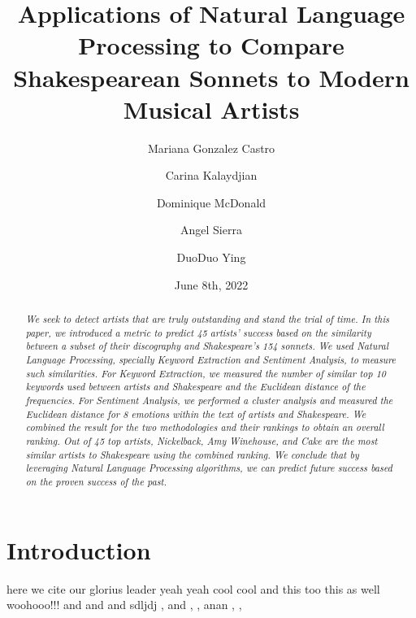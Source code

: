 \documentclass[10pt,a4paper]{article}
\title{Applications of Natural Language Processing to Compare Shakespearean Sonnets to Modern Musical Artists}
\author[*]{Mariana Gonzalez Castro}
\author[*]{Carina Kalaydjian}
\author[*]{Dominique McDonald}
\author[*]{Angel Sierra}
\author[*]{DuoDuo Ying}
\affil[*]{Department of Statistics, UCLA}
\date{June 8th, 2022}
\newcommand{\abstractinenglishname}{Abstract}
\newenvironment{abstractinenglish}{
        \def\abstractname{\abstractinenglishname}
	\begin{abstract}
}{
        \end{abstract}
}
\begin{document}
\maketitle
\vspace{6pt}

\begin{abstractinenglish}
\emph{We seek to detect artists that are truly outstanding and stand the trial of time. In this paper, we introduced a metric to predict 45 artists’ success based on the similarity between a subset of their discography and Shakespeare’s 154 sonnets. We used Natural Language Processing, specially Keyword Extraction and Sentiment Analysis, to measure such similarities. For Keyword Extraction, we measured the number of similar top 10 keywords used between artists and Shakespeare and the Euclidean distance of the frequencies. For Sentiment Analysis, we performed a cluster analysis and measured the Euclidean distance for 8 emotions within the text of artists and Shakespeare. We combined the result for the two methodologies and their rankings to obtain an overall ranking. Out of 45 top artists, Nickelback, Amy Winehouse, and Cake are the most similar artists to Shakespeare using the combined ranking. We conclude that by leveraging Natural Language Processing algorithms, we can predict future success based on the proven success of the past. }
\end{abstractinenglish}

\section{Introduction}
%


here we cite \cite{web1} our glorius leader \cite{web2} yeah yeah cool cool \cite{briney2015data} and this too \cite{monkey} this as well \cite{sonnetsData} woohooo!!! \cite{musicData} and \cite{syuzhet} and \cite{tm} and \cite{shakeFacts} sdljdj \cite{k-means} , \cite{NLP-for-music} and  \cite{NLP-for-lyrics}, \cite{knowledge-graphs}, \cite{nrc-sentiment}anan \cite{music-world}, \cite{seifert}, \cite{aguiar}
\end{document}

